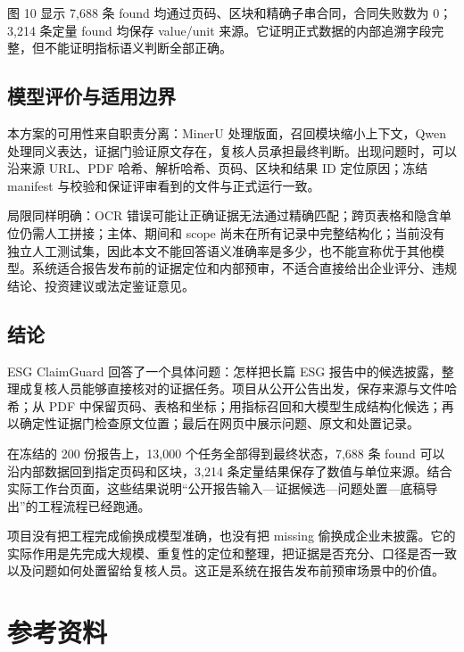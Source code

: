 \documentclass[UTF8,a4paper,11pt]{ctexart}
\begin{document}
图 10 显示 7,688 条 found 均通过页码、区块和精确子串合同，合同失败数为 0；3,214 条定量 found 均保存 value/unit 来源。它证明正式数据的内部追溯字段完整，但不能证明指标语义判断全部正确。\par

\subsection{模型评价与适用边界}

本方案的可用性来自职责分离：MinerU 处理版面，召回模块缩小上下文，Qwen 处理同义表达，证据门验证原文存在，复核人员承担最终判断。出现问题时，可以沿来源 URL、PDF 哈希、解析哈希、页码、区块和结果 ID 定位原因；冻结 manifest 与校验和保证评审看到的文件与正式运行一致。\par

局限同样明确：OCR 错误可能让正确证据无法通过精确匹配；跨页表格和隐含单位仍需人工拼接；主体、期间和 scope 尚未在所有记录中完整结构化；当前没有独立人工测试集，因此本文不能回答语义准确率是多少，也不能宣称优于其他模型。系统适合报告发布前的证据定位和内部预审，不适合直接给出企业评分、违规结论、投资建议或法定鉴证意见。\par

\subsection{结论}

ESG ClaimGuard 回答了一个具体问题：怎样把长篇 ESG 报告中的候选披露，整理成复核人员能够直接核对的证据任务。项目从公开公告出发，保存来源与文件哈希；从 PDF 中保留页码、表格和坐标；用指标召回和大模型生成结构化候选；再以确定性证据门检查原文位置；最后在网页中展示问题、原文和处置记录。\par

在冻结的 200 份报告上，13,000 个任务全部得到最终状态，7,688 条 found 可以沿内部数据回到指定页码和区块，3,214 条定量结果保存了数值与单位来源。结合实际工作台页面，这些结果说明“公开报告输入—证据候选—问题处置—底稿导出”的工程流程已经跑通。\par

项目没有把工程完成偷换成模型准确，也没有把 missing 偷换成企业未披露。它的实际作用是先完成大规模、重复性的定位和整理，把证据是否充分、口径是否一致以及问题如何处置留给复核人员。这正是系统在报告发布前预审场景中的价值。\par

\section{参考资料}
\end{document}
